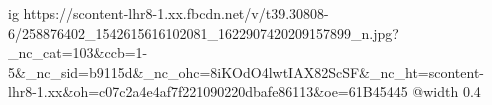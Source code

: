  
 
 
 
 

\ifcmt
  ig https://scontent-lhr8-1.xx.fbcdn.net/v/t39.30808-6/258876402_1542615616102081_1622907420209157899_n.jpg?_nc_cat=103&ccb=1-5&_nc_sid=b9115d&_nc_ohc=8iKOdO4lwtIAX82ScSF&_nc_ht=scontent-lhr8-1.xx&oh=c07c2a4e4af7f221090220dbafe86113&oe=61B45445
  @width 0.4
\fi
